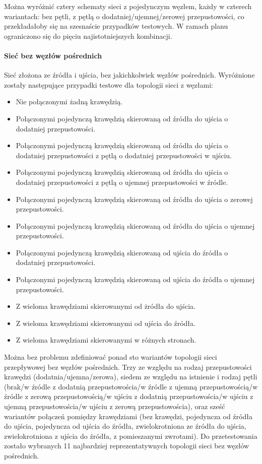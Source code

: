 \begin{itemize}[nosep]
Można wyróżnić cztery schematy sieci z pojedynczym węzłem, każdy w czterech
wariantach: bez pętli, z pętlą o dodatniej/ujemnej/zerowej przepustowości, co
przekładałoby się na szesnaście przypadków testowych. W ramach planu ograniczono
się do pięciu najistotniejszych kombinacji.

\paragraph{Sieć bez węzłów pośrednich}
Sieć złożona ze źródła i ujścia, bez jakichkolwiek węzłów pośrednich. Wyróżnione
zostały następujące przypadki testowe dla topologii sieci z węzłami:
\begin{itemize}[nosep]
    \item Nie połączonymi żadną krawędzią.
    \item Połączonymi pojedynczą krawędzią skierowaną od źródła do ujścia o dodatniej przepustowości.
    \item Połączonymi pojedynczą krawędzią skierowaną od źródła do ujścia o dodatniej przepustowości z pętlą o dodatniej przepustowości w ujściu.
    \item Połączonymi pojedynczą krawędzią skierowaną od źródła do ujścia o dodatniej przepustowości z pętlą o ujemnej przepustowości w źródle.
    \item Połączonymi pojedynczą krawędzią skierowaną od źródła do ujścia o zerowej przepustowości.
    \item Połączonymi pojedynczą krawędzią skierowaną od źródła do ujścia o ujemnej przepustowości.
    \item Połączonymi pojedynczą krawędzią skierowaną od ujścia do źródła o dodatniej przepustowości.
    \item Połączonymi pojedynczą krawędzią skierowaną od ujścia do źródła o ujemnej przepustowości.
    \item Z wieloma krawędziami skierowanymi od żródła do ujścia.
    \item Z wieloma krawędziami skierowanymi od ujścia do źródła.
    \item Z wieloma krawędziami skierowanymi w różnych stronach.
\end{itemize}
Można bez problemu zdefiniować ponad sto wariantów topologii sieci przepływowej
bez węzłów pośrednich. Trzy ze względu na rodzaj przepustowości krawędzi
(dodatnia/ujemna/zerowa), siedem ze względu na istnienie i rodzaj pętli (brak/w
źródle z dodatnią przepustowościa/w źródle z ujemną przepustowością/w źródle z
zerową przepustowością/w ujściu z dodatnią przepustowościa/w ujściu z ujemną
przepustowościa/w ujściu z zerową przepustowościa), oraz sześć wariantów
połączeń pomiędzy krawędziami (bez krawędzi, pojedyncza od źródła do ujścia,
pojedyncza od ujścia do źródła, zwielokrotniona ze źródła do ujścia,
zwielokrotniona z ujścia do źródła, z pomieszanymi zwrotami). Do przetestowania
zostało wybranych 11 najbardziej reprezentatywnych topologii sieci bez węzłów
pośrednich.


\end{itemize}
